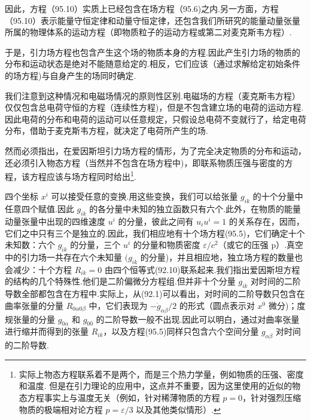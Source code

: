因此，方程（95.10）实质上已经包含在场方程（95.6)之内.另一方面，方程（95.10）表示能量守恒定律和动量守恒定律，还包含我们所研究的能量动量张量所属的物理体系的运动方程（即物质粒子的运动方程或第二对麦克斯韦方程）.

于是，引力场方程也包含产生这个场的物质本身的方程.因此产生引力场的物质的分布和运动状态是绝对不能随意给定的.相反，它们应该（通过求解给定初始条件的场方程)与自身产生的场同时确定.

我们注意到这种情况和电磁场情况的原则性区别.电磁场的方程（麦克斯韦方程）仅仅包含总电荷守恒的方程（连续性方程)，但是不包含建立场的电荷的运动方程.因此电荷的分布和电荷的运动可以任意规定，只假设总电荷不变就行了，给定电荷分布，借助于麦克斯韦方程，就决定了电荷所产生的场.

然而必须指出，在爱因斯坦引力场方程的情形，为了完全决定物质的分布和运动，还必须引入物态方程（当然并不包含在场方程中)，即联系物质压强与密度的方程，该方程应该与场方程同时给出\footnote{实际上物态方程联系着不是两个，而是三个热力学量，例如物质的压强、密度和温度. 但是在引力理论的应用中，这点并不重要，因为这里使用的近似的物态方程事实上与温度无关（例如，针对稀薄物质的方程 $p=0$，针对强烈压缩物质的极端相对论方程 $p=\varepsilon/3$ 以及其他类似情形）.}.

四个坐标 $x^i$ 可以接受任意的变换.用这些变换，我们可以给张量 $g_{ik}$ 的十个分量中任意四个赋值.因此 $g_{ik}$ 的各分量中未知的独立函数只有六个.此外，在物质的能量动量张量中出现的四维速度 $u^i$ 的分量，彼此之间有 $u_iu^i=1$ 的关系存在，因而，它们之中只有三个是独立的.因此，我们相应地有十个场方程(95.5)，它们确定十个未知数：六个 $g_{ik}$ 的分量，三个 $u^i$ 的分量和物质密度 $\varepsilon/c^2$（或它的压强 p）.真空中的引力场一共存在六个未知量 $(g_{ik}$ 的分量)，并且相应地，独立场方程的数量也会减少：十个方程 $R_{ik}=0$ 由四个恒等式(92.10)联系起来.我们指出爱因斯坦方程的结构的几个特殊性.他们是二阶偏微分方程组.但并非十个分量 $g_{ik}$ 对时间的二阶导数全部都包含在方程中.实际上，从(92.1)可以看出，对时间的二阶导数只包含在曲率张量的分量 $R_{0\alpha 0\beta}$ 中，它们表现为 $-\ddot{g}_{\alpha\beta}/2$ 的形式（圆点表示对 $x^0$ 微分)；度规张量的分量 $g_{0\alpha}$ 和 $g_{00}$ 的二阶导数一般不出现.因此可以明白，通过对曲率张量进行缩并而得到的张量 $R_{ik}$，以及方程(95.5)同样只包含六个空间分量 $g_{\alpha\beta}$ 对时间的二阶导数.

